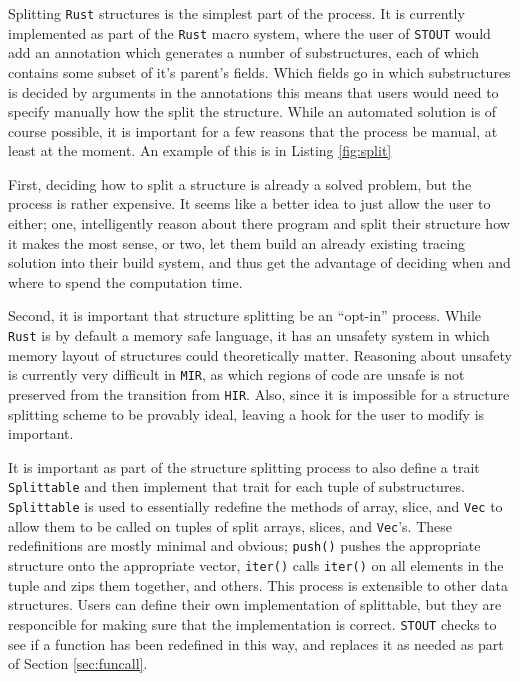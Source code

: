 \documentclass[prodmode,acmtecs]{acmsmall} %
\newcommand{\rustname}{{\texttt{Rust}}}
\def \rust {\rustname{}\xspace}
\newcommand{\mirname}{{\texttt{MIR}}}
\def \mir {\mirname{}\xspace}
\newcommand{\hirname}{{\texttt{HIR}}}
\def \hir {\hirname{}\xspace}
\newcommand{\vecname}{{\texttt{Vec}}}
\def \vec{\vecname{}\xspace}
\newcommand{\projectname}{{\texttt{STOUT}}}
\def \name{\projectname\xspace}
\begin{document}
Splitting \rust structures is the simplest part of the process. It is currently
implemented as part of the \rust macro system, where the user of \name
would add an annotation which generates a number
of substructures, each of which contains some subset of it's parent's 
fields. Which fields go in which substructures is decided by arguments 
in the annotations 
this means
that users would need to specify manually how the split the structure. While an
automated solution is of course possible, it is important for a few reasons that
the process be manual, at least at the moment. An example of this
is in Listing \ref{fig:split}

First, deciding how to split a structure is already a solved problem,
but the process is rather expensive. 
It seems like a better idea to just 
allow the user to either; one, 
intelligently reason about there program and split their structure 
how it makes the most sense, or two, 
let them build an already existing tracing solution into their build system,
and thus get the advantage of deciding when and where to spend the 
computation time.

Second, it is important that structure splitting be an ``opt-in'' process.
While \rust is by default a memory safe language, it has an
unsafety system in which memory layout of structures could theoretically matter.
Reasoning about unsafety is currently very difficult in \mir, as
which regions of code are unsafe is not preserved from the transition
from \hir. Also, since it is impossible for a structure splitting scheme
to be provably ideal, leaving a hook for the user to modify is important.

It is important as part of the structure splitting process to also
define a trait \texttt{Splittable} and then implement that
trait for each tuple of substructures.
\texttt{Splittable} is used to essentially redefine
the methods of array, slice, and \vec 
to allow them to be called on tuples of split arrays, slices, and \vec's.  
These redefinitions are mostly minimal and obvious; 
\texttt{push()} pushes the appropriate structure onto the appropriate
vector, \texttt{iter()} calls \texttt{iter()} on all
elements in the tuple and zips them together, and others.
This process is extensible to other data structures. Users can
define their own implementation of splittable, but they
are responcible for making sure that the implementation is correct.
\name checks to see if a function has been redefined in this
way, and replaces it as needed as part of Section \ref{sec:funcall}.
\end{document}
